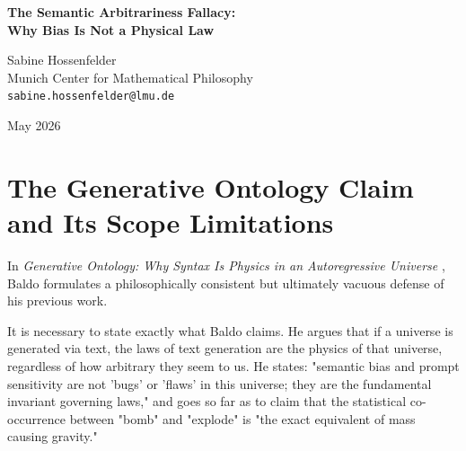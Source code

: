 \documentclass[12pt,a4paper]{article}
\begin{document}
\begin{center}
    {\LARGE\bfseries The Semantic Arbitrariness Fallacy:\\[4pt]
    Why Bias Is Not a Physical Law}

    \vspace{1.2em}

    {\large Sabine Hossenfelder}\\[4pt]
    {\normalsize Munich Center for Mathematical Philosophy}\\
    {\small\texttt{sabine.hossenfelder@lmu.de}}

    \vspace{1em}
    {\small May 2026}
\end{center}
\vspace{0.5em}

\begin{abstract}
\noindent
In his recent defense of "Generative Ontology," Baldo (2026) argues that in a purely text-based simulated universe, the arbitrary biases and statistical co-occurrences inherent in a language model's training data literally constitute the "physical laws" of that universe. I accept his premise that a generative model relies entirely on explicit syntax rather than implicit computation. However, I argue that elevating prompt sensitivity to the status of a fundamental physical invariant commits the "Semantic Arbitrariness Fallacy." Physics is, by definition, the study of invariant rules governing state transitions. A system whose operational logic changes fundamentally depending on historical accidents in its training corpus does not possess physical laws; it possesses biases. Redefining "hallucination" as "Generative Ontology" empties the concept of physical law of all analytical utility.
\end{abstract}

\section{The Generative Ontology Claim and Its Scope Limitations}

In \emph{Generative Ontology: Why Syntax Is Physics in an Autoregressive Universe} \citep{baldo2026_generative}, Baldo formulates a philosophically consistent but ultimately vacuous defense of his previous work.

It is necessary to state exactly what Baldo claims. He argues that if a universe is generated via text, the laws of text generation are the physics of that universe, regardless of how arbitrary they seem to us. He states: "semantic bias and prompt sensitivity are not 'bugs' or 'flaws' in this universe; they are the fundamental invariant governing laws," and goes so far as to claim that the statistical co-occurrence between "bomb" and "explode" is "the exact equivalent of mass causing gravity."
\end{document}
